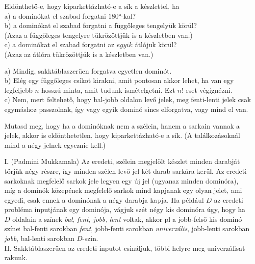 	
	\begin{Exercise}[counter={sorszam}, difficulty=0]\label{dominoforgatos}
		Eldönthet\H o-e, hogy kiparkettázható-e a sík a készlettel, ha\\
		a) a dominókat el szabad forgatni $180°$-kal?\\
		b) a dominókat el szabad forgatni a függ\H oleges tengelyük körül?\\
		(Azaz a függ\H oleges tengelyre t\"ukr\"oz\"ottj\"uk is a k\'eszletben van.)\\
		c) a dominókat el szabad forgatni az $egyik$ átlójuk körül?\\
		(Azaz az \'atl\'ora t\"ukr\"oz\"ottj\"uk is a k\'eszletben van.)
	\end{Exercise}	
	\begin{Answer}
		a) Mindig, sakkt\'ablaszer\H uen forgatva egyetlen domin\'ot.\\
		b) El\'eg egy f\"ugg\H oleges cs\'ikot kirakni, amit pontosan akkor lehet, ha van egy legfeljebb $n$ hossz\'u minta, amit tudunk ism\'etelgetni. Ezt $n!$ eset v\'egign\'ezni.\\
		c) Nem, mert feltehet\H o, hogy bal-jobb oldalon lev\H o jelek, meg fenti-lenti jelek csak egym\'ashoz passzolnak, \'igy vagy egyik domin\'o sincs elforgatva, vagy mind el van.
	\end{Answer}
	
	\begin{Exercise}[counter={sorszam}, difficulty=0]
		Mutasd meg, hogy ha a domin\'oknak nem a sz\'elein, hanem a sarkain vannak a jelek, akkor is eld\"onthetetlen, hogy kiparkettázható-e a sík. (A tal\'alkoz\'asokn\'al mind a n\'egy jelnek egyeznie kell.)
	\end{Exercise}	
	\begin{Answer}
		I. (Padmini Mukkamala) Az eredeti, sz\'elein megjel\"olt k\'eszlet minden darabj\'at t\"orj\"uk n\'egy r\'eszre, \'igy minden sz\'elen lev\H o jel k\'et darab sark\'ara ker\"ul. Az eredeti sarkoknak megfelel\H o sarkok jele legyen egy \'uj jel (ugyanaz minden domin\'ora), m\'ig a domin\'ok k\"ozep\'enek megfelel\H o sarkok mind kapjanak egy olyan jelet, ami egyedi, csak ennek a domin\'onak a n\'egy darabja kapja.
		Ha p\'eld\'aul $D$ az eredeti probl\'ema inputj\'anak egy domin\'oja, v\'agjuk sz\'et n\'egy kis domin\'ora \'ugy, hogy ha $D$ oldalain a sz\'inek \emph{bal, fent, jobb, lent} voltak, akkor pl a jobb-fels\H o kis domin\'o sz\'inei bal-fenti sarokban \emph{fent}, jobb-fenti sarokban \emph{univerz\'alis}, jobb-lenti sarokban \emph{jobb}, bal-lenti sarokban $D$-sz\'in.\\
		II. Sakkt\'ablaszer\H uen az eredeti inputot csin\'aljuk, t\"obbi helyre meg univerz\'alisat rakunk.
	\end{Answer}
	
